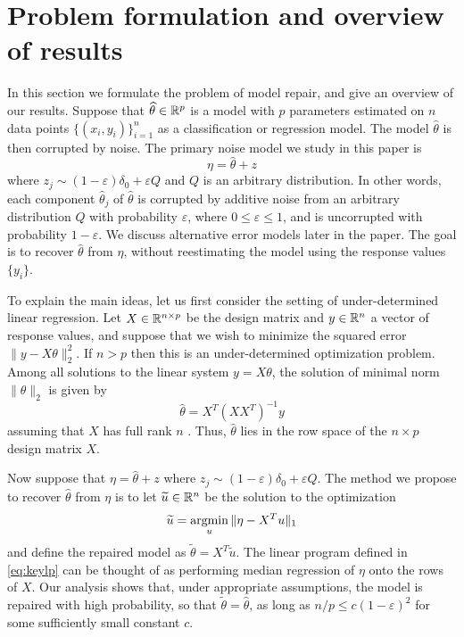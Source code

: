 \let\epsilon\varepsilon
\def\point#1{\vskip10pt\noindent{\it\bfseries #1.}\enspace}
\def\L{{\mathcal L}}

\section{Problem formulation and overview of results}
\label{sec:overview}

In this section we formulate the problem of model repair, and give an overview of our results. Suppose that $\widehat\theta \in \mathbb{R}^p$ is a model with $p$ parameters estimated on $n$ data points $\{(x_i, y_i)\}_{i=1}^n$ as a classification or regression model. The model $\hat\theta$ is then corrupted by noise. The primary noise model we study in this paper is
\begin{equation}
  \eta = \hat\theta + z
\end{equation}
where $z_j \sim (1-\epsilon) \delta_0 + \epsilon Q$ and $Q$ is an arbitrary distribution. In other words, each component $\hat\theta_j$ of $\hat\theta$ is corrupted by additive noise from an arbitrary distribution $Q$ with probability $\epsilon$, where $0\leq \epsilon \leq 1$, and is uncorrupted with probability $1-\epsilon$. We discuss alternative error models later in the paper. The goal is to recover $\hat\theta$ from $\eta$, without reestimating the model using the response values $\{y_i\}$.

\point{Overparameterized linear models}
To explain the main ideas, let us first consider the setting of under-determined linear regression. Let $X\in\mathbb{R}^{n\times p}$ be the design matrix and $y\in\mathbb{R}^n$ a vector of response values, and suppose that we wish to minimize the squared error  $\|y-X\theta\|_2^2$. If $n > p$ then this is an under-determined optimization problem. Among all solutions to the linear system $y = X\theta$, the solution of minimal norm $\|\theta\|_2$ is given by
\begin{equation}
  \hat \theta = X^T (X X^T)^{-1} y
\end{equation}
assuming that $X$ has full rank $n$ \citep{boyd:04}. Thus, $\hat\theta$ lies in the row space of the $n\times p$ design matrix $X$.

Now suppose that $\eta = \hat\theta + z$ where $z_j \sim (1-\epsilon) \delta_0 + \epsilon Q$. The method we propose to recover $\hat\theta$ from $\eta$ is to let $\widetilde u\in\mathbb{R}^n$ be the solution to the optimization
\begin{equation}
  \tilde u = \argmin_u \| \eta  - X^T u\|_1
  \label{eq:keylp}
\end{equation}
and define the repaired model as $\tilde\theta = X^T\tilde u$.
The linear program defined in \eqref{eq:keylp} can be thought of as performing median regression of $\eta$ onto the rows of $X$.
Our analysis shows that, under appropriate assumptions, the model is repaired with high probability, so that $\tilde \theta = \hat\theta$, as long as $n/p \leq c(1-\epsilon)^2$ for some sufficiently small constant $c$.

